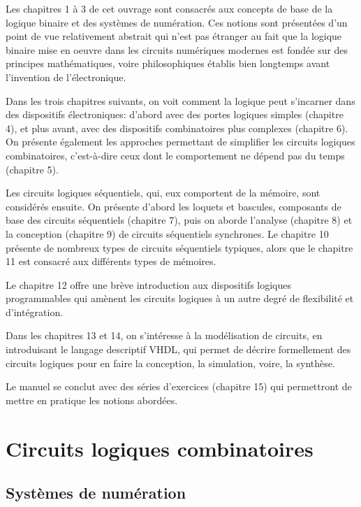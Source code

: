 \documentclass[letter, oneside]{book}
\begin{document}
Les chapitres 1 à 3 de cet ouvrage sont consacrés aux concepts de base
de la logique binaire et des systèmes de numération. Ces notions sont
présentées d'un point de vue relativement abstrait qui n'est pas
étranger au fait que la logique binaire mise en oeuvre dans les
circuits numériques modernes est fondée sur des principes
mathématiques, voire philosophiques établis bien longtemps avant
l'invention de l'électronique.

Dans les trois chapitres suivants, on voit comment la logique peut
s'incarner dans des dispositifs électroniques: d'abord avec des portes
logiques simples (chapitre 4), et plus avant, avec des dispositifs
combinatoires plus complexes (chapitre 6). On présente également les
approches permettant de simplifier les circuits logiques
combinatoires, c'est-à-dire ceux dont le comportement ne dépend pas du
temps (chapitre 5).

Les circuits logiques séquentiels, qui, eux comportent de la
mémoire, sont considérés ensuite. On présente d'abord les loquets et
bascules, composants de base des circuits séquentiels (chapitre 7),
puis on aborde l'analyse (chapitre 8) et la conception (chapitre 9) de
circuits séquentiels synchrones. Le chapitre 10 présente de nombreux
types de circuits séquentiels typiques, alors que le chapitre 11 est
consacré aux différents types de mémoires.

Le chapitre 12 offre une brève introduction aux dispositifs logiques
programmables qui amènent les circuits logiques à un autre degré de
flexibilité et d'intégration.

Dans les chapitres 13 et 14, on s'intéresse à la modélisation de
circuits, en introduisant le langage descriptif VHDL, qui permet de
décrire formellement des circuits logiques pour en faire la
conception, la simulation, voire, la synthèse.

Le manuel se conclut avec des séries d'exercices (chapitre 15) qui
permettront de mettre en pratique les notions abordées.


\setcounter{tocdepth}{3}
\tableofcontents
\listoffigures
\listoftables
\listoflistings

\part{Circuits logiques combinatoires}
\label{sec:orgd0d47aa}
\chapter{Systèmes de numération}
\label{sec:org2695557}
\end{document}

